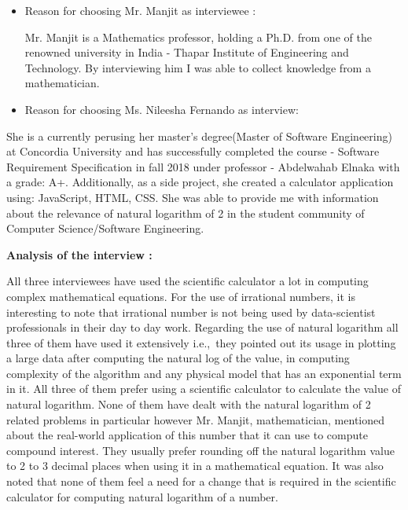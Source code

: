 \documentclass[12pt]{article}
\begin{document}
\begin{itemize}
	\item Reason for choosing Mr. Manjit as interviewee :\par

Mr. Manjit is a Mathematics professor, holding a Ph.D. from one of the renowned university in India - Thapar Institute of Engineering and Technology. By interviewing him I was able to collect knowledge from a mathematician.\par

	\item Reason for choosing Ms. Nileesha Fernando as interview:
\end{itemize}\par

She is a currently perusing her master’s degree(Master of Software Engineering) at Concordia University and has successfully completed the course - Software Requirement Specification in fall 2018 under professor - Abdelwahab Elnaka with a grade: A+. Additionally, as a side project, she created a calculator application using: JavaScript, HTML, CSS. She was able to provide me with information about the relevance of natural logarithm of 2 in the student community of Computer Science/Software Engineering.\par

\textbf{Analysis of the interview :}\par

All three interviewees have used the scientific calculator a lot in computing complex mathematical equations. For the use of irrational numbers, it is interesting to note that irrational number is not being used by data-scientist professionals in their day to day work. Regarding the use of natural logarithm all three of them have used it extensively i.e.,\ they pointed out its usage in plotting a large data after computing the natural log of the value,  in computing complexity of the algorithm and any physical model that has an exponential term in it. All three of them prefer using a scientific calculator to calculate the value of natural logarithm. None of them have dealt with the natural logarithm of 2 related problems in particular however Mr. Manjit, mathematician, mentioned about the real-world application of this number that it can use to compute compound interest. They usually prefer rounding off the natural logarithm value to 2 to 3 decimal places when using it in a mathematical equation. It was also noted that none of them feel a need for a change that is required in the scientific calculator for computing natural logarithm of a number.\par
\end{document}
